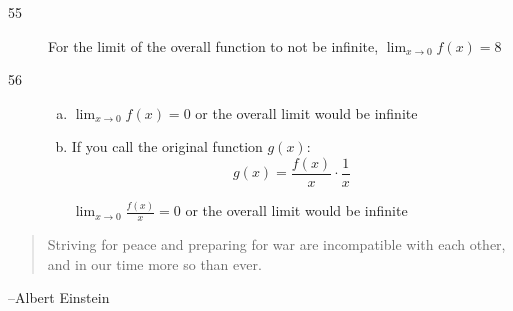 \documentclass[letterpaper]{exam}
\begin{document}
\begin{description}
      \item[55]
        For the limit of the overall function to not be infinite,
        $\lim_{x \to 0} f(x) = \boxed{ 8 }$

      \item[56]
        \begin{enumerate}[(a)]
          \item $\lim_{x \to 0} f(x) = 0$ or the overall limit would be infinite

          \item If you call the original function $g(x)$:
            \[
              g(x) = \frac{f(x)}{x} \cdot \frac{1}{x}
            \]

            $\lim_{x \to 0} \frac{f(x)}{x} = 0$ or the overall limit would
            be infinite

        \end{enumerate}
    \end{description}

  \else
    \vspace{11 cm}
    \begin{quote}
      \begin{em}
        Striving for peace and preparing for war are incompatible with each
        other, and in our time more so than ever. 
      \end{em}
    \end{quote}
    \hspace{1 cm} --Albert Einstein
  \fi
\end{document}
